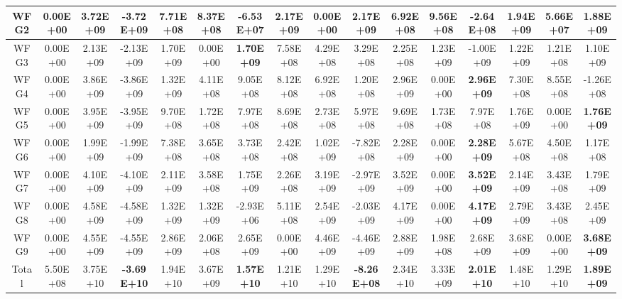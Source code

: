 \begin{table}[h]
{\begin{tabular}{|c|c|c|c|c|c|c|c|c|c|c|c|c|c|c|c|}
WFG2 & 0.00E+00 & 3.72E+09 & -3.72E+09 & 7.71E+08 & 8.37E+08 & -6.53E+07 & 2.17E+09 & 0.00E+00 & \textbf{2.17E+09} & 6.92E+08 & 9.56E+08 & -2.64E+08 & 1.94E+09 & 5.66E+07 & 1.88E+09 \\ \hline
WFG3 & 0.00E+00 & 2.13E+09 & -2.13E+09 & 1.70E+09 & 0.00E+00 & \textbf{1.70E+09} & 7.58E+08 & 4.29E+08 & 3.29E+08 & 2.25E+08 & 1.23E+09 & -1.00E+09 & 1.22E+09 & 1.21E+08 & 1.10E+09 \\ \hline
WFG4 & 0.00E+00 & 3.86E+09 & -3.86E+09 & 1.32E+09 & 4.11E+08 & 9.05E+08 & 8.12E+08 & 6.92E+08 & 1.20E+08 & 2.96E+09 & 0.00E+00 & \textbf{2.96E+09} & 7.30E+08 & 8.55E+08 & -1.26E+08 \\ \hline
WFG5 & 0.00E+00 & 3.95E+09 & -3.95E+09 & 9.70E+08 & 1.72E+08 & 7.97E+08 & 8.69E+08 & 2.73E+08 & 5.97E+08 & 9.69E+08 & 1.73E+08 & 7.97E+08 & 1.76E+09 & 0.00E+00 & \textbf{1.76E+09} \\ \hline
WFG6 & 0.00E+00 & 1.99E+09 & -1.99E+09 & 7.38E+08 & 3.65E+08 & 3.73E+08 & 2.42E+08 & 1.02E+09 & -7.82E+08 & 2.28E+09 & 0.00E+00 & \textbf{2.28E+09} & 5.67E+08 & 4.50E+08 & 1.17E+08 \\ \hline
WFG7 & 0.00E+00 & 4.10E+09 & -4.10E+09 & 2.11E+09 & 3.58E+08 & 1.75E+09 & 2.26E+08 & 3.19E+09 & -2.97E+09 & 3.52E+09 & 0.00E+00 & \textbf{3.52E+09} & 2.14E+09 & 3.43E+08 & 1.79E+09 \\ \hline
WFG8 & 0.00E+00 & 4.58E+09 & -4.58E+09 & 1.32E+09 & 1.32E+09 & -2.93E+06 & 5.11E+08 & 2.54E+09 & -2.03E+09 & 4.17E+09 & 0.00E+00 & \textbf{4.17E+09} & 2.79E+09 & 3.43E+08 & 2.45E+09 \\ \hline
WFG9 & 0.00E+00 & 4.55E+09 & -4.55E+09 & 2.86E+09 & 2.06E+08 & 2.65E+09 & 0.00E+00 & 4.46E+09 & -4.46E+09 & 2.88E+09 & 1.98E+08 & 2.68E+09 & 3.68E+09 & 0.00E+00 & \textbf{3.68E+09} \\ \hline
Total & 5.50E+08 & 3.75E+10 & \textbf{-3.69E+10} & 1.94E+10 & 3.67E+09 & \textbf{1.57E+10} & 1.21E+10 & 1.29E+10 & \textbf{-8.26E+08} & 2.34E+10 & 3.33E+09 & \textbf{2.01E+10} & 1.48E+10 & 1.29E+10 & \textbf{1.89E+09} \\ \hline
\end{tabular}%
}
\end{table}
